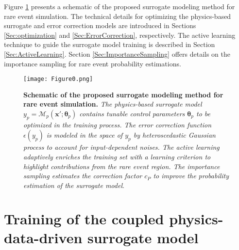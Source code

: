 \documentclass[number,preprint,3p]{elsarticle}
\newcommand{\1}[2]{\mathbb{I}_{#1}\left(#2\right)}
\newcommand{\vect}[1]{\boldsymbol{#1}}
\begin{document}
Figure \ref{Fig:Figure0} presents a schematic of the proposed surrogate modeling method for rare event simulation. The technical details for optimizing the physics-based surrogate and error correction models are introduced in Sections \ref{Sec:optimization} and \ref{Sec:ErrorCorrection}, respectively. The active learning technique to guide the surrogate model training is described in Section \ref{Sec:ActiveLearning}. Section \ref{Sec:ImportanceSampling} offers details on the importance sampling for rare event probability estimations. 
		
	\begin{figure}[H]
		\centering
		\texttt{[image: Figure0.png]}
		\caption{\textbf{Schematic of the proposed surrogate modeling method for rare event simulation.} \textit{The physics-based surrogate model $y_p=\mathcal{M}_p(\vect x';\vect\theta_p)$ contains tunable control parameters $\vect\theta_p$ to be optimized in the training process. The error correction function $\epsilon(y_p)$ is modeled in the space of $y_p$ by heteroscedastic Gaussian process to account for input-dependent noises. The active learning adaptively enriches the training set with a learning criterion to highlight contributions from the rare event region. The importance sampling estimates the correction factor $c_P$ to improve the probability estimation of the surrogate model}.}
		\label{Fig:Figure0}
	\end{figure}
	
	
	\section{Training of the coupled physics-data-driven surrogate model }\label{Sec:surrogatemodeltraining}
\end{document}
